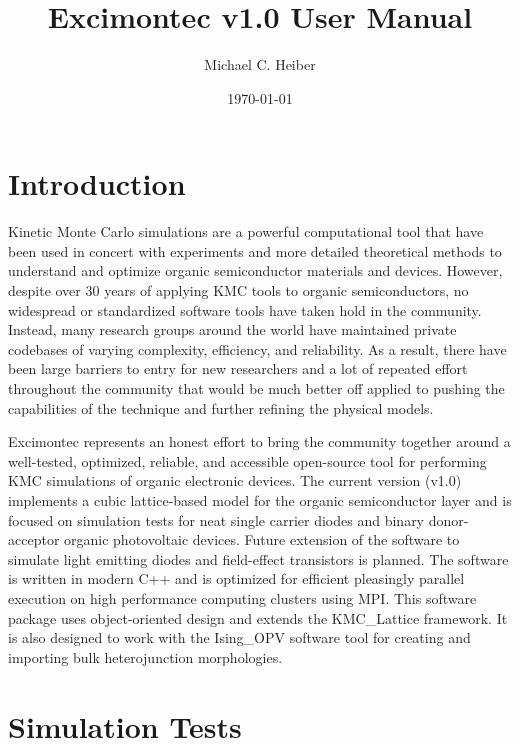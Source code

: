 \documentclass[%
 reprint,onecolumn,notitlepage,
superscriptaddress,longbibliography,
 amsmath,amssymb,
 aps,rmp,floatfix,
]{revtex4-1}
\begin{document}
\title{Excimontec v1.0 User Manual}
\author{Michael C. Heiber}

\date{\today}

\maketitle

\tableofcontents

\newpage

\section{Introduction}

Kinetic Monte Carlo simulations are a powerful computational tool that have been used in concert with experiments and more detailed theoretical methods to understand and optimize organic semiconductor materials and devices.\cite{heiber2019chapter} 
However, despite over 30 years of applying KMC tools to organic semiconductors, no widespread or standardized software tools have taken hold in the community. 
Instead, many research groups around the world have maintained private codebases of varying complexity, efficiency, and reliability. 
As a result, there have been large barriers to entry for new researchers and a lot of repeated effort throughout the community that would be much better off applied to pushing the capabilities of the technique and further refining the physical models.

Excimontec represents an honest effort to bring the community together around a well-tested, optimized, reliable, and accessible open-source tool for performing KMC simulations of organic electronic devices. 
The current version (v1.0) implements a cubic lattice-based model for the organic semiconductor layer and is focused on simulation tests for neat single carrier diodes and binary donor-acceptor organic photovoltaic devices.
Future extension of the software to simulate light emitting diodes and field-effect transistors is planned.
The software is written in modern C++ and is optimized for efficient pleasingly parallel execution on high performance computing clusters using MPI. 
This software package uses object-oriented design and extends the KMC\_Lattice framework.\cite{heiber2019joss} 
It is also designed to work with the Ising\_OPV software tool for creating and importing bulk heterojunction morphologies.\cite{heiber2018joss}

\section{Simulation Tests}
\end{document}
